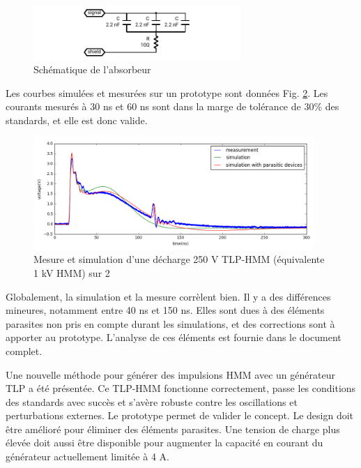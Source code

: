\begin{figure}[!h]
  \centering
  \includegraphics[width=0.7\textwidth]{src/1/figures/absorber_schematic.pdf}
  \caption{Schématique de l'absorbeur}
  \label{fig:absorber_schematic}
\end{figure}

Les courbes simulées et mesurées sur un prototype sont données Fig. \ref{fig:tlp_hmm_waveforms}.
Les courants mesurés à 30 ns et 60 ns sont dans la marge de tolérance de 30\% des standards, et elle est donc valide.

\begin{figure}[!h]
  \centering
  \includegraphics[width=0.95\textwidth]{src/1/figures/tlp_hmm_waveforms.png}
  \caption{Mesure et simulation d'une décharge 250 V TLP-HMM (équivalente 1 kV HMM) sur 2\textOmega{}}
  \label{fig:tlp_hmm_waveforms}
\end{figure}

Globalement, la simulation et la mesure corrèlent bien.
Il y a des différences mineures, notamment entre 40 ns et 150 ns.
Elles sont dues à des éléments parasites non pris en compte durant les simulations, et des corrections sont à apporter au prototype.
L'analyse de ces éléments est fournie dans le document complet.

Une nouvelle méthode pour générer des impulsions HMM avec un générateur TLP a été présentée.
Ce TLP-HMM fonctionne correctement, passe les conditions des standards avec succès et s'avère robuste contre les oscillations et perturbations externes.
Le prototype permet de valider le concept.
Le design doit être amélioré pour éliminer des éléments parasites.
Une tension de charge plus élevée doit aussi être disponible pour augmenter la capacité en courant du générateur actuellement limitée à 4 A.

